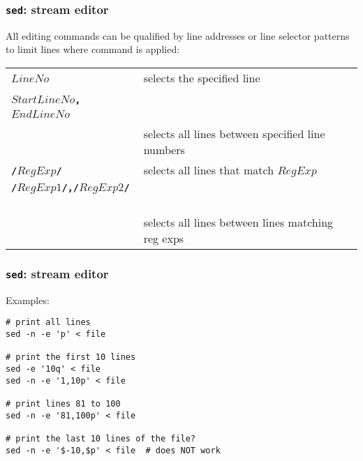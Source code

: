 \begin{frame}[shrink]
\frametitle{\textbf{\tt{sed}}: stream editor}
All editing commands can be qualified by line addresses or
line selector patterns to limit lines where command is applied:

\begin{center}
\begin{tabular}{lll}

  \begin{minipage}{2cm}{\bf{$LineNo$}} ~\end{minipage}
   & \begin{minipage}{10cm}selects the specified line~\end{minipage}\\[1ex]
\\[1ex]

  \begin{minipage}{2cm}{\bf{$StartLineNo$\textbf{\tt{,}}$EndLineNo$}} ~\end{minipage} \\
   & \begin{minipage}{10cm}selects all lines between specified line numbers~\end{minipage}
\\[1ex]

  \begin{minipage}{2cm}{\bf{\textbf{\tt{/}}$RegExp$\textbf{\tt{/}}}} ~\end{minipage}
   & \begin{minipage}{10cm}selects all lines that match $RegExp$~\end{minipage}
\\[1ex]

  \begin{minipage}{2cm}{\bf{\textbf{\tt{/}}$RegExp1$\textbf{\tt{/,/}}$RegExp2$\textbf{\tt{/}}}} ~\end{minipage} \\
   & \begin{minipage}{10cm}selects all lines between lines matching reg exps~\end{minipage}
\\[1ex]
\end{tabular}
\end{center}

\end{frame}

\begin{frame}[fragile]
\frametitle{\textbf{\tt{sed}}: stream editor}
Examples:
\begin{verbatim}
# print all lines
sed -n -e 'p' < file

# print the first 10 lines
sed -e '10q' < file
sed -n -e '1,10p' < file

# print lines 81 to 100
sed -n -e '81,100p' < file

# print the last 10 lines of the file?
sed -n -e '$-10,$p' < file  # does NOT work
\end{verbatim}

\end{frame}

